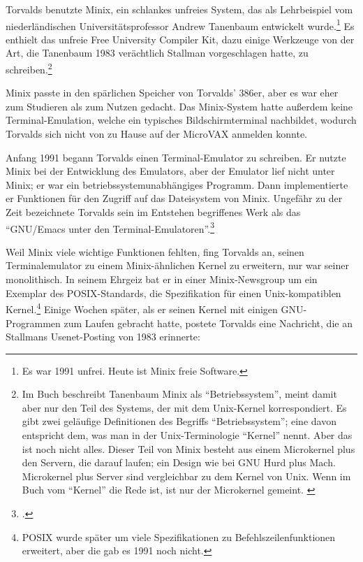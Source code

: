 Torvalds benutzte Minix, ein schlankes unfreies System, das als Lehrbeispiel vom niederländischen Universitätsprofessor Andrew Tanenbaum\label{Tanenbaum} entwickelt wurde.\footnote{Es war 1991 unfrei. Heute ist Minix freie Software.} Es enthielt das unfreie Free University Compiler Kit, dazu einige Werkzeuge von der Art, die Tanenbaum 1983 verächtlich Stallman vorgeschlagen hatte, zu schreiben.\footnote{Im Buch  beschreibt Tanenbaum Minix als "`Betriebssystem"', meint damit aber nur den Teil des Systems, der mit dem Unix-Kernel korrespondiert. Es gibt zwei geläufige Definitionen des Begriffs "`Betriebssystem"'; eine davon entspricht dem, was man in der Unix-Terminologie "`Kernel"' nennt. Aber das ist noch nicht alles. Dieser Teil von Minix besteht aus einem Microkernel plus den Servern, die darauf laufen; ein Design wie bei GNU Hurd plus Mach. Microkernel plus Server sind vergleichbar zu dem Kernel von Unix. Wenn im Buch vom "`Kernel"' die Rede ist, ist nur der Microkernel gemeint. \cite[Vgl.][]{tanos}}

Minix passte in den spärlichen Speicher von Torvalds' 386er, aber es war eher zum Studieren als zum Nutzen gedacht. Das Minix-System hatte außerdem keine Terminal-Emulation, welche ein typisches Bildschirmterminal nachbildet, wodurch Torvalds sich nicht von zu Hause auf der MicroVAX anmelden konnte.

Anfang 1991 begann Torvalds einen Terminal-Emulator zu schreiben. Er nutzte Minix bei der Entwicklung des Emulators, aber der Emulator lief nicht unter Minix; er war ein betriebssystemunabhängiges Programm. Dann implementierte er Funktionen für den Zugriff auf das Dateisystem von Minix. Ungefähr zu der Zeit bezeichnete Torvalds sein im Entstehen begriffenes Werk als das "`GNU/Emacs unter den Terminal-Emulatoren"'.\footcite[][S.\,78]{tojff}

Weil Minix viele wichtige Funktionen fehlten, fing Torvalds an, seinen Terminalemulator zu einem Minix-ähnlichen Kernel zu erweitern, nur war seiner monolithisch. In seinem Ehrgeiz bat er in einer Minix-Newsgroup um ein Exemplar des POSIX-Standards, die Spezifikation für einen Unix-kompatiblen Kernel.\footnote{POSIX wurde später um viele Spezifikationen zu Befehlszeilenfunktionen erweitert, aber die gab es 1991 noch nicht.} Einige Wochen später, als er seinen Kernel mit einigen GNU-Programmen zum Laufen gebracht hatte, postete Torvalds eine Nachricht, die an Stallmans Usenet-Posting von 1983 erinnerte:

